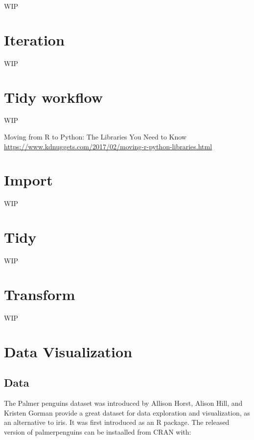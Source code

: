 \documentclass[]{book}
\begin{document}
WIP

\hypertarget{iteration}{%
\chapter{Iteration}\label{iteration}}

WIP

\hypertarget{tidy-workflow}{%
\chapter{Tidy workflow}\label{tidy-workflow}}

WIP

Moving from R to Python: The Libraries You Need to Know \url{https://www.kdnuggets.com/2017/02/moving-r-python-libraries.html}

\hypertarget{import}{%
\chapter{Import}\label{import}}

WIP

\hypertarget{tidy}{%
\chapter{Tidy}\label{tidy}}

WIP

\hypertarget{transform}{%
\chapter{Transform}\label{transform}}

WIP

\hypertarget{data-visualization}{%
\chapter{Data Visualization}\label{data-visualization}}

\hypertarget{data}{%
\section{Data}\label{data}}

The Palmer penguins dataset was introduced by Allison Horst, Alison Hill, and Kristen Gorman provide a great dataset for data exploration and visualization, as an alternative to iris. It was first introduced as an R package. The released version of palmerpenguins can be instaalled from CRAN with:
\end{document}
